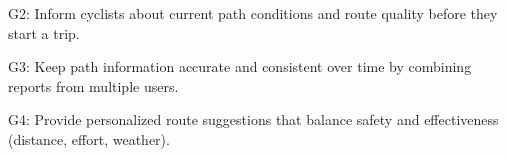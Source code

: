 \documentclass[11pt]{article}
\begin{document}
G2: Inform cyclists about current path conditions and route quality before they start a trip.

G3: Keep path information accurate and consistent over time by combining reports from multiple users.

G4: Provide personalized route suggestions that balance safety and effectiveness (distance, effort, weather).


\clearpage
{}
\label{sect:overview}


\clearpage
{}
\label{sect:requirements}


\clearpage
{}
\label{sect:alloy}


\clearpage
{}
\label{sect:effort}



\clearpage
{}
%
%
\end{document}
